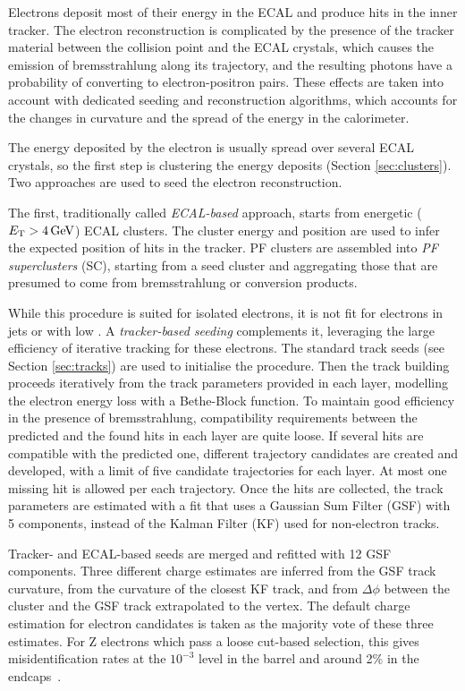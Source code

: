 \label{sec:eleReco}
Electrons deposit most of their energy in the ECAL and produce hits in the inner tracker.
The electron reconstruction is complicated by the presence of the tracker material between the collision point and the ECAL crystals,
which causes the emission of bremsstrahlung along its trajectory, and the resulting photons have a probability of converting to electron-positron pairs.
These effects are taken into account with dedicated seeding and reconstruction algorithms,
which accounts for the changes in curvature and the spread of the energy in the calorimeter.

The energy deposited by the electron is usually spread over several ECAL crystals, so the first step is clustering the energy deposits (Section \ref{sec:clusters}).
Two approaches are used to seed the electron reconstruction.

The first, traditionally called \textit{ECAL-based} approach, starts from energetic ($E_{\mathrm{T}} > 4\,\text{Ge\hspace{-.08em}V}$) ECAL clusters.
The cluster energy and position are used to infer the expected position of hits in the tracker.
PF clusters are assembled into \textit{PF superclusters} (SC), starting from a seed cluster and aggregating those that are presumed to come from bremsstrahlung or conversion products.

While this procedure is suited for isolated electrons, it is not fit for electrons in jets or with low \pt.
A \textit{tracker-based seeding} complements it, leveraging the large efficiency of iterative tracking for these electrons.
The standard track seeds (see Section \ref{sec:tracks}) are used to initialise the procedure.
Then the track building proceeds iteratively from the track parameters provided in each layer, modelling the electron energy loss with a Bethe-Block function.
To maintain good efficiency in the presence of bremsstrahlung, compatibility requirements between the predicted and the found hits in each layer are quite loose.
If several hits are compatible with the predicted one, different trajectory candidates are created and developed,
with a limit of five candidate trajectories for each layer.
At most one missing hit is allowed per each trajectory.
Once the hits are collected, the track parameters are estimated with a fit that uses a Gaussian Sum Filter (GSF) \cite{CMS-NOTE-2005-001} with 5 components,
instead of the Kalman Filter (KF) \cite{billoir.qian:simultaneous} used for non-electron tracks.

Tracker- and ECAL-based seeds are merged and refitted with 12 GSF components.
Three different charge estimates are inferred from the GSF track curvature,
from the curvature of the closest KF track, and from $\Delta\phi$ between the cluster and the GSF track extrapolated to the vertex.
The default charge estimation for electron candidates is taken as the majority vote of these three estimates.
For Z electrons which pass a loose cut-based selection, this gives misidentification rates at the $10^{-3}$ level in the barrel and around 2\% in the endcaps~\cite{Rembser_2019}.

